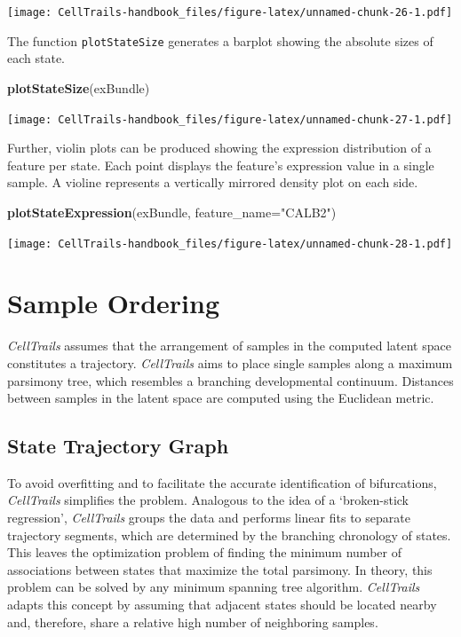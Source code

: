 \documentclass[]{book}
\newenvironment{Shaded}{\begin{snugshade}}{\end{snugshade}}
\newcommand{\KeywordTok}[1]{\textcolor[rgb]{0.13,0.29,0.53}{\textbf{#1}}}
\newcommand{\DataTypeTok}[1]{\textcolor[rgb]{0.13,0.29,0.53}{#1}}
\newcommand{\StringTok}[1]{\textcolor[rgb]{0.31,0.60,0.02}{#1}}
\newcommand{\NormalTok}[1]{#1}
\theoremstyle{definition}
\theoremstyle{definition}
\theoremstyle{definition}
\theoremstyle{remark}
\begin{document}
\texttt{[image: CellTrails-handbook\_files/figure-latex/unnamed-chunk-26-1.pdf]}

The function \texttt{plotStateSize} generates a barplot showing the
absolute sizes of each state.

\begin{Shaded}
\begin{Highlighting}[]
\KeywordTok{plotStateSize}\NormalTok{(exBundle)}
\end{Highlighting}
\end{Shaded}

\texttt{[image: CellTrails-handbook\_files/figure-latex/unnamed-chunk-27-1.pdf]}

Further, violin plots can be produced showing the expression
distribution of a feature per state. Each point displays the feature's
expression value in a single sample. A violine represents a vertically
mirrored density plot on each side.

\begin{Shaded}
\begin{Highlighting}[]
\KeywordTok{plotStateExpression}\NormalTok{(exBundle, }\DataTypeTok{feature_name=}\StringTok{"CALB2"}\NormalTok{)}
\end{Highlighting}
\end{Shaded}

\texttt{[image: CellTrails-handbook\_files/figure-latex/unnamed-chunk-28-1.pdf]}

\chapter{Sample Ordering}\label{sample-ordering}

\emph{CellTrails} assumes that the arrangement of samples in the
computed latent space constitutes a trajectory. \emph{CellTrails} aims
to place single samples along a maximum parsimony tree, which resembles
a branching developmental continuum. Distances between samples in the
latent space are computed using the Euclidean metric.

\section{State Trajectory Graph}\label{state-trajectory-graph}

To avoid overfitting and to facilitate the accurate identification of
bifurcations, \emph{CellTrails} simplifies the problem. Analogous to the
idea of a `broken-stick regression', \emph{CellTrails} groups the data
and performs linear fits to separate trajectory segments, which are
determined by the branching chronology of states. This leaves the
optimization problem of finding the minimum number of associations
between states that maximize the total parsimony. In theory, this
problem can be solved by any minimum spanning tree algorithm.
\emph{CellTrails} adapts this concept by assuming that adjacent states
should be located nearby and, therefore, share a relative high number of
neighboring samples.
\end{document}
